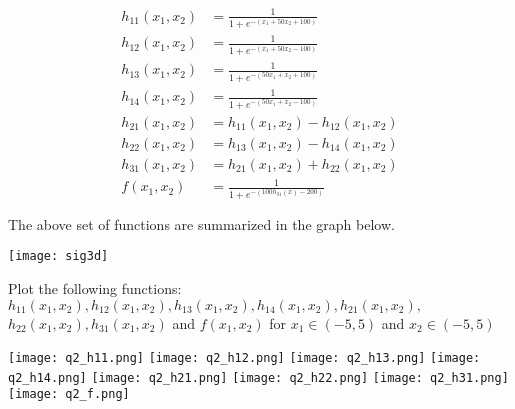 \documentclass[solution,addpoints,12pt]{exam}
\begin{document}
\begin{questions}
\begin{parts}
                  \begin{align*}
                    h_{11}(x_1, x_2) &= \frac{1}{1 + e^{-(x_1 + 50x_2 + 100)}}  \\
                    h_{12}(x_1, x_2) &= \frac{1}{1 + e^{-(x_1 + 50x_2 - 100)}}  \\
                    h_{13}(x_1, x_2) &= \frac{1}{1 + e^{-(50x_1 + x_2 + 100)}}  \\
                    h_{14}(x_1, x_2) &= \frac{1}{1 + e^{-(50x_1 + x_2 - 100)}}  \\
                    h_{21}(x_1, x_2) &= h_{11}(x_1, x_2) - h_{12}(x_1, x_2)\\
                    h_{22}(x_1, x_2) &= h_{13}(x_1, x_2) - h_{14}(x_1, x_2)\\
                    h_{31}(x_1, x_2) &= h_{21}(x_1, x_2) + h_{22}(x_1, x_2)\\
                    f(x_1, x_2) &= \frac{1}{1 + e^{-(100h_{31}(x) - 200)}}  \\\\
                  \end{align*}
                  The above set of functions are summarized in the graph below.
                    \begin{center}
            		  \texttt{[image: sig3d]}
          		    \end{center} 
                  Plot the following functions: $h_{11}(x_1, x_2), h_{12}(x_1, x_2), h_{13}(x_1, x_2), h_{14}(x_1, x_2), h_{21}(x_1, x_2),$ $h_{22}(x_1, x_2), h_{31}(x_1, x_2)$ and $f(x_1, x_2)$ for $x_1 \in (-5, 5)$ and $x_2 \in (-5, 5)$
            \begin{solution}
            \begin{center}
                \texttt{[image: q2\_h11.png]}
                \texttt{[image: q2\_h12.png]}
                \texttt{[image: q2\_h13.png]}
                \texttt{[image: q2\_h14.png]}
                \texttt{[image: q2\_h21.png]}
                \texttt{[image: q2\_h22.png]}
                \texttt{[image: q2\_h31.png]}
                \texttt{[image: q2\_f.png]}
            \end{center}
            \end{solution}
                 
           \end{parts}
\end{questions}             
\end{document}
